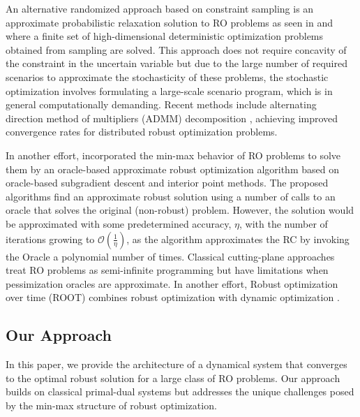 \documentclass[journal,twoside,web]{ieeecolor}
\newcommand{\rev}[1]{\textcolor{revisionblue}{#1}}
\begin{document}
An alternative randomized approach based on constraint sampling is an approximate probabilistic relaxation solution to RO problems as seen in \cite{calafiore2004} and \cite{calafiore2010} where a finite set of high-dimensional deterministic optimization problems obtained from sampling are solved. This approach does not require concavity of the constraint in the uncertain variable but due to the large number of required scenarios to approximate the stochasticity of these problems, the stochastic optimization involves formulating a large-scale scenario program, which is in general computationally demanding.
\rev{Recent methods include alternating direction method of multipliers (ADMM) decomposition \cite{rostampour2021}, achieving improved convergence rates for distributed robust optimization problems.}

In another effort, \cite{bental2015} incorporated the min-max behavior of RO problems to solve them by an oracle-based approximate robust optimization algorithm based on oracle-based subgradient descent and interior point methods. The proposed algorithms find an approximate robust solution using a number of calls to an oracle that solves the original (non-robust) problem. However, the solution would be approximated with some predetermined accuracy, $\eta$, with the number of iterations growing to $\mathcal{O}(\frac{1}{\eta})$, as the algorithm approximates the RC by invoking the Oracle a polynomial number of times.
\rev{Classical cutting-plane approaches \cite{mutapcic2009} treat RO problems as semi-infinite programming but have limitations when pessimization oracles are approximate.} In another effort, \rev{Robust optimization over time (ROOT) combines robust optimization with dynamic optimization \cite{yazdani2023,aigner2023}.}

\subsection*{\rev{Our Approach}}

\rev{In this paper, we provide the architecture of a dynamical system that converges to the optimal robust solution for a large class of RO problems. Our approach builds on classical primal-dual systems \cite{arrow1958,feijer2010} but addresses the unique challenges posed by the min-max structure of robust optimization.} 
\end{document}
